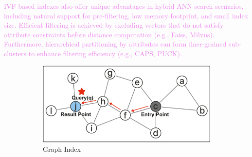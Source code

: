 \documentclass[sigconf, nonacm]{acmart}
\begin{document}
{	\textcolor{violet}{IVF-based indexes also offer unique advantages in hybrid ANN search scenarios, including natural support for pre-filtering, low memory footprint, and small index size. Efficient filtering is achieved by excluding vectors that do not satisfy attribute constraints before distance computation (e.g., Faiss, Milvus). Furthermore, hierarchical partitioning by attributes can form finer-grained sub-clusters to enhance filtering efficiency (e.g., CAPS, PUCK).}
%	
%	
	
	\begin{figure}
		\begin{subfigure}{0.60\columnwidth}
			\centering
			
			\includegraphics[width=\linewidth]{figures/graph.pdf}
			\caption{Graph Index}
			\label{fig:graph}
		\end{subfigure}
		\hfill
		\begin{subfigure}{0.38\columnwidth}
			\centering
			

\end{subfigure}
\end{figure}}
\end{document}
